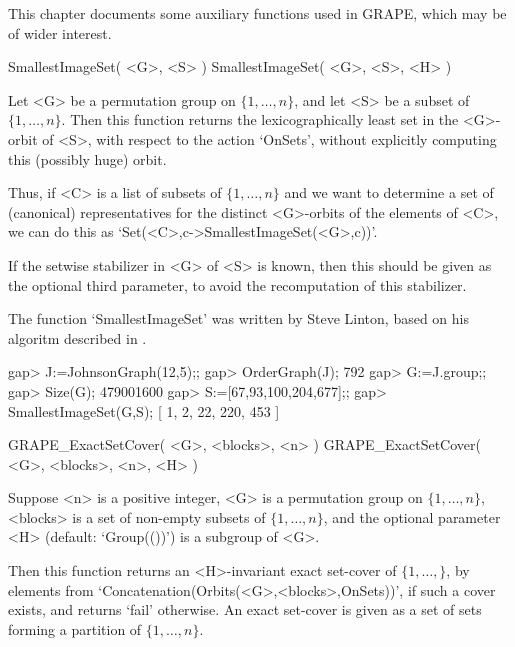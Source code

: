 %
%
%
%
\def\GRAPE{\sf GRAPE}
\def\nauty{\it nauty}
\def\G{\Gamma}
\def\Aut{{\rm Aut}\,}
\def\x{\times}

This chapter documents some auxiliary functions used in {\GRAPE},
which may be of wider interest. 


\>SmallestImageSet( <G>, <S> )
\>SmallestImageSet( <G>, <S>, <H> )

Let <G> be a permutation group on $\{1,\ldots,n\}$, and let <S>
be a subset of $\{1,\ldots,n\}$. Then this function returns the
lexicographically least set in the <G>-orbit of <S>, with respect to the
action `OnSets', without explicitly computing this (possibly huge) orbit.

Thus, if <C> is a list of subsets of $\{1,\ldots,n\}$ and we
want to determine a set of (canonical) representatives for the
distinct <G>-orbits of the elements of <C>, we can do this as
`Set(<C>,c->SmallestImageSet(<G>,c))'.

If the setwise stabilizer in <G> of <S> is known, then this should be
given as the optional third parameter, to avoid the recomputation of
this stabilizer.

The function `SmallestImageSet' was written by Steve Linton, based
on his algoritm described in \cite{Lin04}. 

\beginexample
gap> J:=JohnsonGraph(12,5);;
gap> OrderGraph(J);
792
gap> G:=J.group;;
gap> Size(G);
479001600
gap> S:=[67,93,100,204,677];;
gap> SmallestImageSet(G,S);
[ 1, 2, 22, 220, 453 ]
\endexample


\>GRAPE_ExactSetCover( <G>, <blocks>, <n> )
\>GRAPE_ExactSetCover( <G>, <blocks>, <n>, <H> )

Suppose <n> is a positive integer, <G> is a permutation group
on $\{1,\ldots,n\}$, <blocks> is a set of non-empty subsets
of $\{1,\ldots,n\}$, and the optional parameter <H> (default:
`Group(())') is a subgroup of <G>. 

Then this function returns an <H>-invariant exact 
set-cover of $\{1,\ldots,\}$, by elements from 
`Concatenation(Orbits(<G>,<blocks>,OnSets))', if such a cover exists,
and returns  `fail'  otherwise. An exact set-cover is given as a set of
sets forming a partition of $\{1,\ldots,n\}$.

